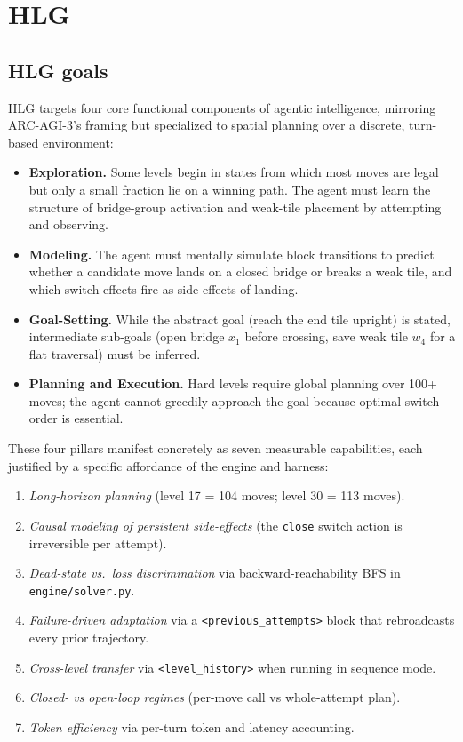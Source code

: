 \section{HLG}
\label{sec:hlg}

\subsection{HLG goals}
\label{sec:goals}

HLG targets four core functional components of agentic intelligence, mirroring
ARC-AGI-3's framing \cite{arcagi3} but specialized to spatial planning over a discrete,
turn-based environment:

\begin{itemize}[leftmargin=1.5em]
    \item \textbf{Exploration.} Some levels begin in states from which most moves are
      legal but only a small fraction lie on a winning path. The agent must learn the
      structure of bridge-group activation and weak-tile placement by attempting and
      observing.
    \item \textbf{Modeling.} The agent must mentally simulate block transitions to
      predict whether a candidate move lands on a closed bridge or breaks a weak tile,
      and which switch effects fire as side-effects of landing.
    \item \textbf{Goal-Setting.} While the abstract goal (reach the end tile upright) is
      stated, intermediate sub-goals (open bridge $x_1$ before crossing, save weak tile
      $w_4$ for a flat traversal) must be inferred.
    \item \textbf{Planning and Execution.} Hard levels require global planning over 100+
      moves; the agent cannot greedily approach the goal because optimal switch order
      is essential.
\end{itemize}

These four pillars manifest concretely as seven measurable capabilities, each justified
by a specific affordance of the engine and harness:

\begin{enumerate}[leftmargin=1.5em]
    \item \emph{Long-horizon planning} (level 17 = 104 moves; level 30 = 113 moves).
    \item \emph{Causal modeling of persistent side-effects} (the
      \texttt{close} switch action is irreversible per attempt).
    \item \emph{Dead-state vs.\ loss discrimination} via backward-reachability BFS in
      \texttt{engine/solver.py}.
    \item \emph{Failure-driven adaptation} via a \texttt{<previous\_attempts>} block
      that rebroadcasts every prior trajectory.
    \item \emph{Cross-level transfer} via \texttt{<level\_history>} when running in
      sequence mode.
    \item \emph{Closed- vs open-loop regimes} (per-move call vs whole-attempt plan).
    \item \emph{Token efficiency} via per-turn token and latency accounting.
\end{enumerate}

